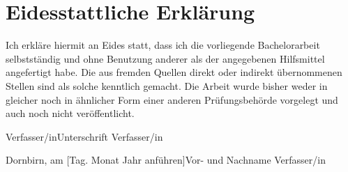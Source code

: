 \documentclass[a4paper,12pt]{scrreprt}
\begin{document}
\chapter*{Eidesstattliche Erklärung}
Ich erkläre hiermit an Eides statt, dass ich die vorliegende Bachelorarbeit selbstständig und ohne Benutzung anderer als der angegebenen Hilfsmittel angefertigt habe. Die aus fremden Quellen direkt oder indirekt übernommenen Stellen sind als solche kenntlich gemacht. Die Arbeit wurde bisher weder in gleicher noch in ähnlicher Form einer anderen Prüfungsbehörde vorgelegt und auch noch nicht veröffentlicht.

\vspace{30mm}
\noindent
Verfasser/in\hfill                                       Unterschrift Verfasser/in

\vspace{3mm}
\noindent
Dornbirn, am [Tag. Monat Jahr anführen]\hfill            Vor- und Nachname Verfasser/in
\end{document}

